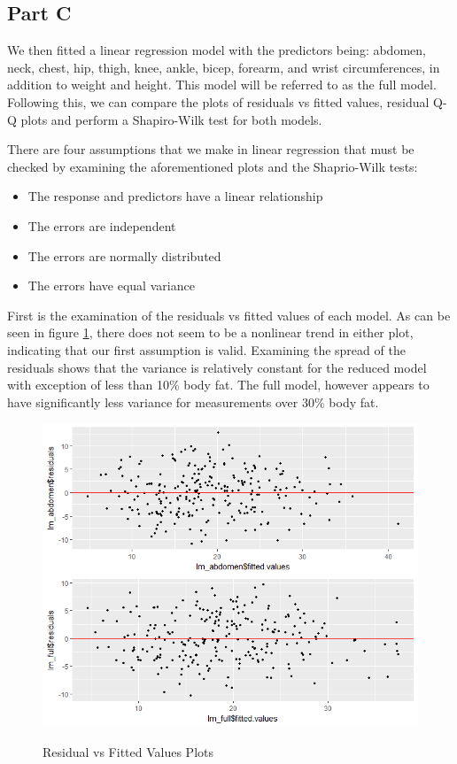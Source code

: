 \documentclass[a4paper, 11pt]{article}
\begin{document}
\subsection*{Part C}

We then fitted a linear regression model with the predictors being: abdomen, neck, chest, hip, thigh, knee, ankle, bicep, forearm, and wrist circumferences, in addition to weight and height. This model will be referred to as the full model. Following this, we can compare the plots of residuals vs fitted values, residual Q-Q plots and perform a Shapiro-Wilk test for both models.

There are four assumptions that we make in linear regression that must be checked by examining the aforementioned plots and the Shaprio-Wilk tests:
\begin{itemize}
	\item The response and predictors have a linear relationship
	\item The errors are independent
	\item The errors are normally distributed
	\item The errors have equal variance
\end{itemize}

First is the examination of the residuals vs fitted values of each model. As can be seen in figure \ref{figure:residuals}, there does not seem to be a nonlinear trend in either plot, indicating that our first assumption is valid. Examining the spread of the residuals shows that the variance is relatively constant for the reduced model with exception of less than 10\% body fat. The full model, however appears to have significantly less variance for measurements over 30\% body fat. 

\begin{figure}[H]
	\centering
	\caption{Residual vs Fitted Values Plots}
	\includegraphics[width=\textwidth]{residuals_vs_fitted.png}
	\label{figure:residuals}
\end{figure}
\end{document}

